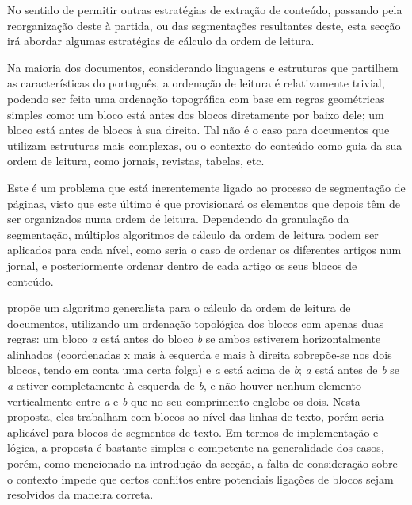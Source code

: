 No sentido de permitir outras estratégias de extração de conteúdo, passando pela reorganização deste à partida, ou das segmentações resultantes deste, esta secção irá abordar algumas estratégias de cálculo da ordem de leitura.

Na maioria dos documentos, considerando linguagens e estruturas que partilhem as características do português, a ordenação de leitura é relativamente trivial, podendo ser feita uma ordenação topográfica com base em regras geométricas simples como: um bloco está antes dos blocos diretamente por baixo dele; um bloco está antes de blocos à sua direita. Tal não é o caso para documentos que utilizam estruturas mais complexas, ou o contexto do conteúdo como guia da sua ordem de leitura, como jornais, revistas, tabelas, etc.

Este é um problema que está inerentemente ligado ao processo de segmentação de páginas, visto que este último é que provisionará os elementos que depois têm de ser organizados numa ordem de leitura. Dependendo da granulação da segmentação, múltiplos algoritmos de cálculo da ordem de leitura podem ser aplicados para cada nível, como seria o caso de ordenar os diferentes artigos num jornal, e posteriormente ordenar dentro de cada artigo os seus blocos de conteúdo.

\cite{article_ro1} propõe um algoritmo generalista para o cálculo da ordem de leitura de documentos, utilizando um ordenação topológica dos blocos com apenas duas regras: um bloco \textit{a} está antes do bloco \textit{b} se ambos estiverem horizontalmente alinhados (coordenadas x mais à esquerda e mais à direita sobrepõe-se nos dois blocos, tendo em conta uma certa folga) e  \textit{a} está acima de \textit{b}; \textit{a} está antes de \textit{b} se \textit{a} estiver completamente à esquerda de \textit{b}, e não houver nenhum elemento verticalmente entre \textit{a} e \textit{b} que no seu comprimento englobe os dois. Nesta proposta, eles trabalham com blocos ao nível das linhas de texto, porém seria aplicável para blocos de segmentos de texto. Em termos de implementação e lógica, a proposta é bastante simples e competente na generalidade dos casos, porém, como mencionado na introdução da secção, a falta de consideração sobre o contexto impede que certos conflitos entre potenciais ligações de blocos sejam resolvidos da maneira correta.

